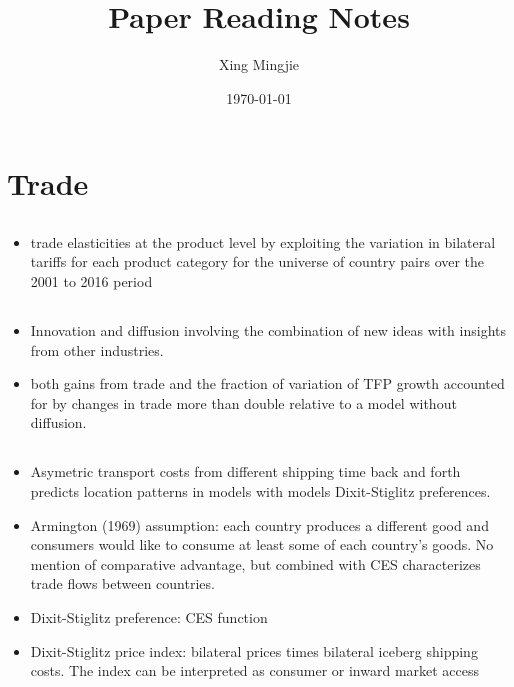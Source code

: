 \documentclass[10pt]{article} %
\title{Paper Reading Notes}
\author{Xing Mingjie}
\date{\today} %
\begin{document}
\maketitle

\tableofcontents

\newpage

\section{Trade}

    \subsection{\cite{FontagneGuimbardOrefice2022}}
    \begin{itemize}
        \item trade elasticities at the product level by exploiting the variation in bilateral tariffs for each product category for the universe of country pairs over the 2001 to 2016 period
    \end{itemize}

    \subsection{\cite{BueraOberfield2020}}
    \begin{itemize}
        \item Innovation and diffusion involving the combination of new ideas with insights from other industries.
        \item both gains from trade and the fraction of variation of TFP growth accounted for by changes in trade more than double relative to a model without diffusion.
    \end{itemize}

    \subsection{\cite{ChenIoannidesRauch2022}}
    \begin{itemize}
        \item Asymetric transport costs from different shipping time back and forth predicts location patterns in models with models Dixit-Stiglitz preferences.
        \item Armington (1969) assumption: each country produces a different good and consumers would like to consume at least some of each country's goods. No mention of comparative advantage, but combined with CES characterizes trade flows between countries.
        \item Dixit-Stiglitz preference: CES function
        \item Dixit-Stiglitz price index: bilateral prices times bilateral iceberg shipping costs. The index can be interpreted as consumer or inward market access
    \end{itemize}
\end{document}
